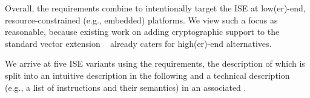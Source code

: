 \noindent
Overall, the requirements combine to intentionally target the ISE at 
 low(er)-end,
resource-constrained (e.g., embedded) platforms.  
We view such a focus as reasonable, because existing work on adding
cryptographic support to the
standard 
vector extension ~\cite[Section 21]{RV:ISA:I:19}
already caters for
high(er)-end
alternatives.

We arrive at five ISE variants using the requirements, the description of 
which is split into
an 
intuitive 
description in the following \SEC[s]
and
a
technical
description
(e.g., a list of instructions and their semantics)
in an associated \APPX.

